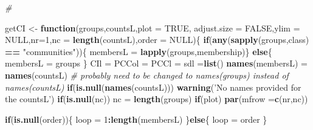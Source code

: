 \documentclass[]{article}
\newenvironment{Shaded}{\begin{snugshade}}{\end{snugshade}}
\newcommand{\CommentTok}[1]{\textcolor[rgb]{0.56,0.35,0.01}{\textit{#1}}}
\newcommand{\ControlFlowTok}[1]{\textcolor[rgb]{0.13,0.29,0.53}{\textbf{#1}}}
\newcommand{\DataTypeTok}[1]{\textcolor[rgb]{0.13,0.29,0.53}{#1}}
\newcommand{\DecValTok}[1]{\textcolor[rgb]{0.00,0.00,0.81}{#1}}
\newcommand{\KeywordTok}[1]{\textcolor[rgb]{0.13,0.29,0.53}{\textbf{#1}}}
\newcommand{\NormalTok}[1]{#1}
\newcommand{\OperatorTok}[1]{\textcolor[rgb]{0.81,0.36,0.00}{\textbf{#1}}}
\newcommand{\OtherTok}[1]{\textcolor[rgb]{0.56,0.35,0.01}{#1}}
\newcommand{\StringTok}[1]{\textcolor[rgb]{0.31,0.60,0.02}{#1}}
\begin{document}
\begin{Shaded}
\begin{Highlighting}[]
\CommentTok{#}

\NormalTok{getCI <-}\StringTok{ }\ControlFlowTok{function}\NormalTok{(groups,countsL,}\DataTypeTok{plot =} \OtherTok{TRUE}\NormalTok{, }\DataTypeTok{adjust.size =} \OtherTok{FALSE}\NormalTok{,}\DataTypeTok{ylim =} \OtherTok{NULL}\NormalTok{,}\DataTypeTok{nr=}\DecValTok{1}\NormalTok{,}\DataTypeTok{nc =} \KeywordTok{length}\NormalTok{(countsL),}\DataTypeTok{order =} \OtherTok{NULL}\NormalTok{)\{}
  \ControlFlowTok{if}\NormalTok{(}\KeywordTok{any}\NormalTok{(}\KeywordTok{sapply}\NormalTok{(groups,class) }\OperatorTok{==}\StringTok{ "communities"}\NormalTok{))\{}
\NormalTok{    membersL =}\StringTok{ }\KeywordTok{lapply}\NormalTok{(groups,membership)\}}
  \ControlFlowTok{else}\NormalTok{\{}
\NormalTok{    membersL =}\StringTok{ }\NormalTok{groups}
\NormalTok{  \}}
\NormalTok{  CIl =}\StringTok{ }\NormalTok{PCCol =}\StringTok{ }\NormalTok{PCCl =}\StringTok{ }\NormalTok{sdl =}\KeywordTok{list}\NormalTok{()}
  \KeywordTok{names}\NormalTok{(membersL) =}\StringTok{ }\KeywordTok{names}\NormalTok{(countsL) }\CommentTok{# probably need to be changed to names(groups) instead of names(countsL)}
  \ControlFlowTok{if}\NormalTok{(}\KeywordTok{is.null}\NormalTok{(}\KeywordTok{names}\NormalTok{(countsL))) }\KeywordTok{warning}\NormalTok{(}\StringTok{'No names provided for the countsL'}\NormalTok{)}
  \ControlFlowTok{if}\NormalTok{(}\KeywordTok{is.null}\NormalTok{(nc)) nc =}\StringTok{ }\KeywordTok{length}\NormalTok{(groups)}
  \ControlFlowTok{if}\NormalTok{(plot) }\KeywordTok{par}\NormalTok{(}\DataTypeTok{mfrow =}\KeywordTok{c}\NormalTok{(nr,nc))}

  \ControlFlowTok{if}\NormalTok{(}\KeywordTok{is.null}\NormalTok{(order))\{}
\NormalTok{    loop =}\StringTok{ }\DecValTok{1}\OperatorTok{:}\KeywordTok{length}\NormalTok{(membersL)}
\NormalTok{  \}}\ControlFlowTok{else}\NormalTok{\{}
\NormalTok{    loop =}\StringTok{ }\NormalTok{order}
\NormalTok{  \}}


\end{Highlighting}
\end{Shaded}
\end{document}
